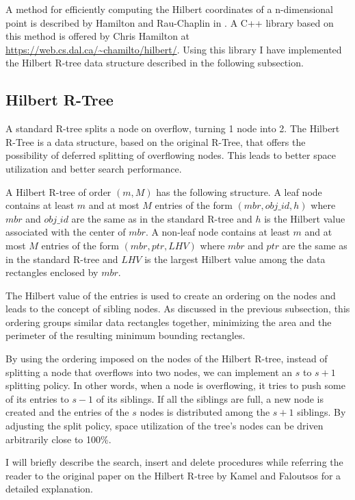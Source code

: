 \documentclass[11pt, a4paper, oneside]{article}
\begin{document}
A method for efficiently computing the Hilbert coordinates of a n-dimensional point is described by Hamilton and Rau-Chaplin in \cite{Hamilton:2008:CHI:1330769.1330914}. A C++ library based on this method is offered by Chris Hamilton at \url{https://web.cs.dal.ca/~chamilto/hilbert/}. Using this library I have implemented the Hilbert R-tree data structure described in the following subsection.

\subsection{Hilbert R-Tree}
A standard R-tree splits a node on overflow, turning 1 node into 2. The Hilbert R-Tree is a data structure, based on the original R-Tree, that offers the possibility of deferred splitting of overflowing nodes. This leads to better space utilization and better search performance.

A Hilbert R-tree of order $(m,M)$ has the following structure. A leaf node contains at least $m$ and at most $M$ entries of the form $(mbr, obj\_id, h)$ where $mbr$ and $obj\_id$ are the same as in the standard R-tree and $h$ is the Hilbert value associated with the center of $mbr$. A non-leaf node contains at least $m$ and at most $M$ entries of the form $(mbr, ptr, LHV)$ where $mbr$ and $ptr$ are the same as in the standard R-tree and $LHV$ is the largest Hilbert value among the data rectangles enclosed by $mbr$.

The Hilbert value of the entries is used to create an ordering on the nodes and leads to the concept of sibling nodes. As discussed in the previous subsection, this ordering groups similar data rectangles together, minimizing the area and the perimeter of the resulting minimum bounding rectangles.

By using the ordering imposed on the nodes of the Hilbert R-tree, instead of splitting a node that overflows into two nodes, we can implement an $s$ to $s+1$ splitting policy. In other words, when a node is overflowing, it tries to push some of its entries to $s-1$ of its siblings. If all the siblings are full, a new node is created and the entries of the $s$ nodes is distributed among the $s+1$ siblings. By adjusting the split policy, space utilization of the tree's nodes can be driven arbitrarily close to 100\%.

I will briefly describe the search, insert and delete procedures while referring the reader to the original paper on the Hilbert R-tree by Kamel and Faloutsos \cite{Kamel:1994:HRI:645920.673001} for a detailed explanation.
\end{document}
